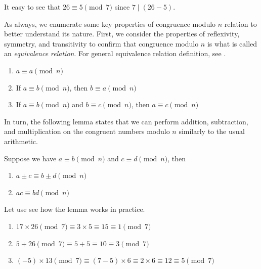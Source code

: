 \documentclass[../../book.tex]{subfiles}
\begin{document}
\begin{example}
    It easy to see that $26 \equiv 5 \pmod{7}$ since $7 \mid (26-5)$. 
\end{example}

As always, we enumerate some key properties of congruence modulo $n$ relation to 
better understand its nature. First, we consider the properties of reflexivity,
symmetry, and transitivity to confirm that congruence modulo $n$ is what 
is called an \textit{equivalence relation}. For general 
equivalence relation definition, see .

\begin{lemma} 
    \hfill
    \begin{enumerate}
        \item $a \equiv a \pmod{n}$
        \item If $a \equiv b \pmod{n}$, then $b \equiv a \pmod{n}$
        \item If $a \equiv b \pmod{n}$ and $b \equiv c \pmod{n}$, then $a \equiv c \pmod{n}$
    \end{enumerate}
\end{lemma}

In turn, the following lemma states that we can perform addition, subtraction,
and multiplication on the congruent numbers modulo $n$ similarly to the usual
arithmetic.

\begin{lemma}
    Suppose we have $a \equiv b \pmod{n}$ and $c \equiv d \pmod{n}$, then 
        \begin{enumerate}
            \item $a \pm c \equiv b \pm d \pmod{n}$
            \item $ac \equiv bd \pmod{n}$
        \end{enumerate}
\end{lemma}

\begin{example}
    Let use see how the lemma works in practice.
    \begin{enumerate}
        \item $17 \times 26 \pmod{7} \equiv 3 \times 5 \equiv 15 \equiv 1 \pmod{7}$
        \item $5 + 26 \pmod{7} \equiv 5 + 5 \equiv 10 \equiv 3 \pmod{7}$
        \item $(-5) \times 13 \pmod{7} \equiv (7-5) \times 6 \equiv 2 \times 6 \equiv 12 \equiv 5 \pmod{7}$
    \end{enumerate}
\end{example}
\end{document}
